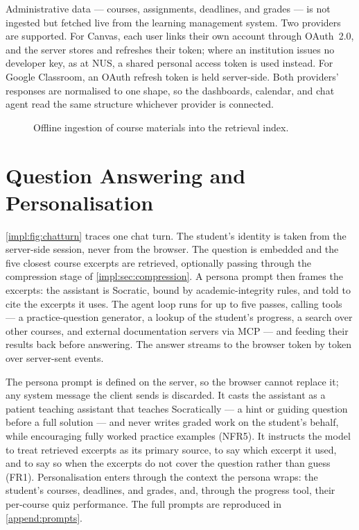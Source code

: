 Administrative data --- courses, assignments, deadlines, and grades --- is
not ingested but fetched live from the learning management system. Two
providers are supported. For Canvas, each user links their own account
through OAuth~2.0, and the server stores and refreshes their token; where an
institution issues no developer key, as at NUS, a shared personal access
token is used instead. For Google Classroom, an OAuth refresh token is held
server-side. Both providers' responses are normalised to one shape, so the
dashboards, calendar, and chat agent read the same structure whichever
provider is connected.

\begin{figure}[htb]
  \centering
  
  \caption{Offline ingestion of course materials into the retrieval index.}
  \label{impl:fig:ingest}
\end{figure}

\section{Question Answering and Personalisation}
\label{impl:sec:qa}

\autoref{impl:fig:chatturn} traces one chat turn. The student's identity is
taken from the server-side session, never from the browser. The question is
embedded and the five closest course excerpts are retrieved, optionally
passing through the compression stage of \autoref{impl:sec:compression}. A
persona prompt then frames the excerpts: the assistant is Socratic, bound by
academic-integrity rules, and told to cite the excerpts it uses. The agent
loop runs for up to five passes, calling tools --- a practice-question
generator, a lookup of the student's progress, a search over other courses,
and external documentation servers via MCP --- and feeding their results
back before answering. The answer streams to the browser token by token
over server-sent events.

The persona prompt is defined on the server, so the browser cannot replace
it; any system message the client sends is discarded. It casts the assistant
as a patient teaching assistant that teaches Socratically --- a hint or
guiding question before a full solution --- and never writes graded work on
the student's behalf, while encouraging fully worked practice examples
(NFR5). It instructs the model to treat retrieved excerpts as its primary
source, to say which excerpt it used, and to say so when the excerpts do not
cover the question rather than guess (FR1). Personalisation enters through
the context the persona wraps: the student's courses, deadlines, and grades,
and, through the progress tool, their per-course quiz performance. The full
prompts are reproduced in \autoref{append:prompts}.

